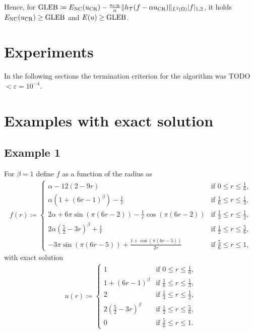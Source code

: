 \documentclass[draft=false,twoside,12pt]{scrreprt}
\begin{document}
Hence, for $\textup{GLEB} \coloneqq 
  E_\textup{NC}(u_\textup{CR}) - \frac{\kappa_{\textup{CR}}}{\alpha}\Vert
  h_\mathcal{T}(f-\alpha u_\textup{CR})\Vert_{L^2(\Omega)} |f|_{1,2}$, it holds
  $E_\textup{NC}(u_\textup{CR})\geq \textup{GLEB}$ and $E(u)\geq \textup{GLEB}$.

\section{Experiments}
In the following sections the termination criterion for the algorithm
was TODO $<\varepsilon=10^{-4}$. %

\section{Examples with exact solution}
\subsection{Example 1}
For $\beta=1$ define $f$ as a function of the radius as
\begin{align}
  \label{equ:f01}
  f(r)\coloneqq 
  \begin{cases}
    \alpha-12(2-9r) & \text{if } 0\leq r\leq\frac{1}{6},\\
    \alpha(1+(6r-1)^\beta)-\frac{1}{r} & \text{if } \frac{1}{6}\leq r\leq
    \frac{1}{3},\\
    2\alpha+6\pi\sin(\pi(6r-2))-\frac{1}{r}\cos(\pi(6r-2)) &
    \text{if } \frac{1}{3}\leq r\leq\frac{1}{2},\\
    2\alpha(\frac{5}{2}-3r)^\beta+\frac{1}{r}&
    \text{if } \frac{1}{2}\leq r\leq\frac{5}{6},\\
    -3\pi\sin(\pi(6r-5))+\frac{1+\cos(\pi(6r-5))}{2r} &
    \text{if } \frac{5}{6}\leq r\leq 1,
  \end{cases}
\end{align}
with exact solution
\begin{align}
  \label{equ:f01exactSol}
  u(r)\coloneqq
  \begin{cases}
    1 & \text{if } 0\leq r\leq\frac{1}{6},\\
    1+(6r-1)^\beta & \text{if } \frac{1}{6}\leq r\leq
    \frac{1}{3},\\
    2 &
    \text{if } \frac{1}{3}\leq r\leq\frac{1}{2},\\
    2(\frac{5}{2}-3r)^\beta &
    \text{if } \frac{1}{2}\leq r\leq\frac{5}{6},\\
    0 &
    \text{if } \frac{5}{6}\leq r\leq 1.
  \end{cases}
\end{align}
\end{document}

